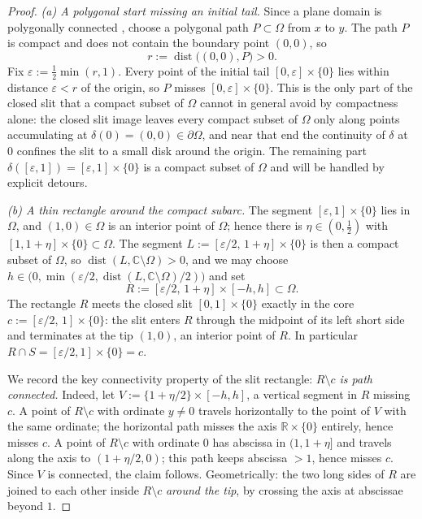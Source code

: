 \documentclass[11pt,reqno]{amsart}
\theoremstyle{definition}
\theoremstyle{remark}
\newcommand{\C}{\mathbb C}
\newcommand{\dist}{\operatorname{dist}}
\begin{document}
\begin{proof}
\emph{(a) A polygonal start missing an initial tail.}
Since a plane domain is polygonally connected \cite{New51}, choose a polygonal path
$P\subset\Omega$ from $x$ to $y$. The path $P$ is compact and does not contain the
boundary point $(0,0)$, so
\[
r:=\dist\bigl((0,0),P\bigr)>0 .
\]
Fix $\varepsilon:=\tfrac12\min(r,1)$. Every point of the initial tail
$[0,\varepsilon]\times\{0\}$ lies within distance $\varepsilon<r$ of the origin, so $P$
misses $[0,\varepsilon]\times\{0\}$. This is the only part of the closed slit that a
compact subset of $\Omega$ cannot in general avoid by compactness alone: the closed slit
image leaves every compact subset of $\Omega$ only along points accumulating at
$\delta(0)=(0,0)\in\partial\Omega$, and near that end the continuity of $\delta$ at $0$
confines the slit to a small disk around the origin. The remaining part
$\delta([\varepsilon,1])=[\varepsilon,1]\times\{0\}$ is a compact subset of $\Omega$ and
will be handled by explicit detours.

\emph{(b) A thin rectangle around the compact subarc.}
The segment $[\varepsilon,1]\times\{0\}$ lies in $\Omega$, and $(1,0)\in\Omega$ is an
interior point of $\Omega$; hence there is $\eta\in(0,\tfrac12)$ with
$[1,1+\eta]\times\{0\}\subset\Omega$. The segment
$L:=[\varepsilon/2,\,1+\eta]\times\{0\}$ is then a compact subset of $\Omega$, so
$\dist(L,\C\setminus\Omega)>0$, and we may choose
$h\in\bigl(0,\min(\varepsilon/2,\dist(L,\C\setminus\Omega)/2)\bigr)$ and set
\[
R:=[\varepsilon/2,\,1+\eta]\times[-h,h]\subset\Omega .
\]
The rectangle $R$ meets the closed slit $[0,1]\times\{0\}$ exactly in the core
$c:=[\varepsilon/2,\,1]\times\{0\}$: the slit enters $R$ through the midpoint of its
left short side and terminates at the tip $(1,0)$, an interior point of $R$. In
particular $R\cap S=[\varepsilon/2,1]\times\{0\}=c$.

We record the key connectivity property of the slit rectangle: \emph{$R\setminus c$ is
path connected.} Indeed, let $V:=\{1+\eta/2\}\times[-h,h]$, a vertical segment in $R$
missing $c$. A point of $R\setminus c$ with ordinate $y\neq0$ travels horizontally to
the point of $V$ with the same ordinate; the horizontal path misses the axis
$\mathbb{R}\times\{0\}$ entirely, hence misses $c$. A point of $R\setminus c$ with
ordinate $0$ has abscissa in $(1,1+\eta]$ and travels along the axis to $(1+\eta/2,0)$;
this path keeps abscissa $>1$, hence misses $c$. Since $V$ is connected, the claim
follows. Geometrically: the two long sides of $R$ are joined to each other inside
$R\setminus c$ \emph{around the tip}, by crossing the axis at abscissae beyond $1$.


\end{proof}
\end{document}
